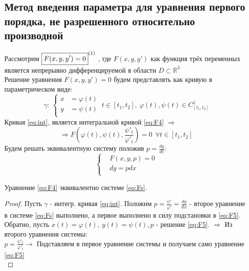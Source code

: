 \subsection{Метод введения параметра для уравнения первого порядка, не разрешенного относительно производной}
\begin{proposition}
	Рассмотрим $ \boxed{F(x,  y, y') = 0}^{\eqnum\label{eq:F4}} \ $, где $ F(x, y, y') $ как функция трёх переменных является непрерывно дифференцируемой в области $ D \subset \mathbb{ R }^3 $ \\
	Решение уравнения $F(x, y, y') = 0 $ будем представлять как кривую в параметрическом виде: \\
	\begin{equation} \label{eq:int}
	\gamma: \	\left\{
	\begin{aligned}
		x &= \varphi(t)  \\
		y &= \psi(t) \\   
	\end{aligned}
	\right. \ t \in [t_1, t_2], \ \varphi(t), \psi(t) \in C^1_{[t_1, t_2]}                                             
	\end{equation}
	Кривая \eqref{eq:int}, является интегральной кривой \eqref{eq:F4} $ \Rightarrow $ \\
	\begin{equation} \label{eq:F5}
	 \Rightarrow F\left(\varphi(t), \psi(t), \frac{\psi'_t}{\varphi'_t}\right) = 0 \ \ \forall t \in [t_1, t_2] 
	\end{equation}
	Будем решать эквивалентную систему положив $p = \frac{dy}{dt} $: 
	\begin{equation} \label{eq:Fs}
		\left\{
		\begin{aligned}
			&F(x, y, p) = 0  \\
			&dy = pdx \\   
		\end{aligned}
		\right.                                                          
	\end{equation}
\end{proposition}

\begin{proposition}
	Уравнение \eqref{eq:F4} эквивалентно системе \eqref{eq:Fs}.
\end{proposition}

\begin{proof}
	Пусть $\gamma $ - интегр. кривая \eqref{eq:int}. Положим $ p = \frac{\psi'}{\varphi'} = \frac{dy}{dx} $ - второе уравнение в системе \eqref{eq:Fs} выполнено, а первое выполнено в силу подстановки в \eqref{eq:F5}. Обратно, пусть $x(t) = \varphi(t), \ y(t) = \psi(t), p$ - решение \eqref{eq:F5}. $ \Rightarrow$ Из второго уравнения системы:\\ 
	$ p = \frac{\psi'_t}{\varphi'_t} \rightarrow $ Подставляем в первое уравнение системы и получаем само уравнение \eqref{eq:F5}\\
\end{proof}

